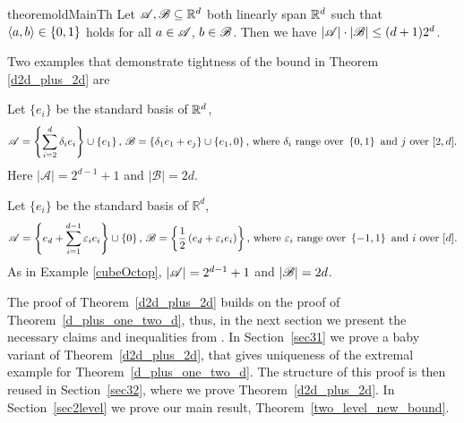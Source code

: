 \begin{restatable}{theorem}{oldMainTh}
    \label{d_plus_one_two_d}
    Let ${\mathscr{A}},{\mathscr{B}} \subseteq {\mathbb{R}}^d$ both linearly span ${\mathbb{R}}^d$ such that $\langle a, b\rangle \in \{0,1\}$ holds for all $a \in {\mathscr{A}}$, $b \in {\mathscr{B}}$.
    Then we have $|{\mathscr{A}}| \cdot |{\mathscr{B}}| \le (d+1) 2^d$.
\end{restatable}

\noindent Two examples that demonstrate tightness of the bound in Theorem \ref{d2d_plus_2d} are

\begin{example}\label{cubeOctop}
    Let $\{e_i\}$ be the standard basis of ${\mathbb{R}}^d$, 
    \begin{equation*}
        {\mathscr{A}}=\left\{\sum_{i=2}^{d}\delta_i e_i\right\}\cup\left\{e_1\right\}\text{, }{\mathscr{B}}=\left\{\delta_1 e_1 + e_j\right\} \cup \left\{e_1, 0\right\}\text{, where }\delta_i\text{ range over }\left\{0, 1\right\}\text{ and }j\text{ over }[2,d].
    \end{equation*}
    Here $\left|\mathcal{A}\right|=2^{d-1}+1$ and $\left|\mathcal{B}\right|=2d$.
\end{example}

\begin{example}\label{crosspoly}
    Let $\{e_i\}$ be the standard basis of $\mathbb{R}^d$,
    \begin{equation*}
        {\mathscr{A}}=\left\{e_d+\sum_{i=1}^{d-1}\varepsilon_i e_i\right\}\cup\left\{0\right\}\text{, }{\mathscr{B}}=\left\{\frac{1}{2}\left(e_d+\varepsilon_i e_i\right)\right\}\text{, where }\varepsilon_i\text{ range over }\left\{-1, 1\right\}\text{ and $i$ over }[d].
    \end{equation*}
    As in Example \ref{cubeOctop}, $\left|{\mathscr{A}}\right|=2^{d-1}+1$ and $\left|{\mathscr{B}}\right|=2d$.
\end{example}

The proof of Theorem~\ref{d2d_plus_2d} builds on the proof of Theorem~\ref{d_plus_one_two_d}, thus, in the next section we present the necessary claims and inequalities from \cite{kupavskii22}. In Section~\ref{sec31} we prove a baby variant of Theorem~\ref{d2d_plus_2d}, that gives uniqueness of the extremal example for Theorem~\ref{d_plus_one_two_d}. The structure of this proof is then reused in Section~\ref{sec32}, where we prove Theorem~\ref{d2d_plus_2d}. In Section~\ref{sec2level} we prove our main result, Theorem~\ref{two_level_new_bound}. 

